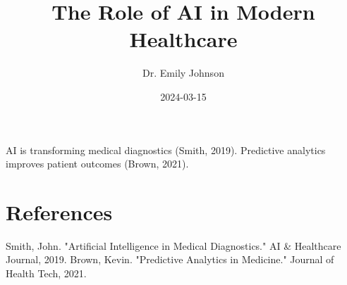 \documentclass{article}
\title{The Role of AI in Modern Healthcare}
\author{Dr. Emily Johnson}
\date{2024-03-15}
\begin{document}
\maketitle
AI is transforming medical diagnostics (Smith, 2019). Predictive analytics improves patient outcomes (Brown, 2021).
\section{References}
Smith, John. "Artificial Intelligence in Medical Diagnostics." AI \& Healthcare Journal, 2019.
Brown, Kevin. "Predictive Analytics in Medicine." Journal of Health Tech, 2021.
\end{document}

